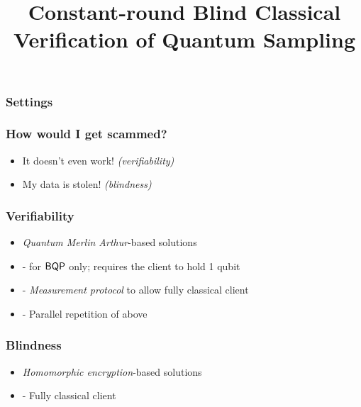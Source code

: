 \documentclass{beamer}
\title{Constant-round Blind Classical Verification of Quantum Sampling}
\begin{document}
\begin{frame}
	\titlepage
\end{frame}

\begin{frame}
	\frametitle{Settings}


	\begin{flushright}
	\end{flushright}
\end{frame}

\begin{frame}
	\frametitle{How would I get scammed?}
	\begin{itemize}
		\item It doesn't even work! \emph{(verifiability)}
		\item My data is stolen! \emph{(blindness)}
	\end{itemize}
\end{frame}

\begin{frame}
	\frametitle{Verifiability}
	\begin{itemize}[<+->]
		\item \emph{Quantum Merlin Arthur}-based solutions
		\item \cite{mf16} - for $\operatorname{\mathsf{BQP}}$ only; requires the client to hold 1 qubit
		\item \cite{FOCS:Mahadev18a} - \emph{Measurement protocol} to allow fully classical client
		\item \cite{arXiv:ChiaChungYam19} - Parallel repetition of above
	\end{itemize}
\end{frame}

\begin{frame}
	\frametitle{Blindness}
	\begin{itemize}[<+->]
		\item \emph{Homomorphic encryption}-based solutions
		\item \cite{mahadev_qfhe} - Fully classical client
	\end{itemize}
\end{frame}
\end{document}
